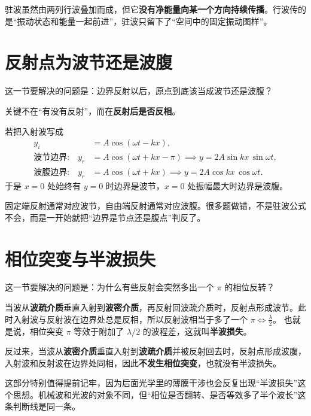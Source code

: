 \documentclass[lang=cn,11pt]{elegantbook}
\begin{document}
\begin{note}
驻波虽然由两列行波叠加而成，但它\textbf{没有净能量向某一个方向持续传播}。行波传的是“振动状态和能量一起前进”，驻波只留下了“空间中的固定振动图样”。
\end{note}

\section{反射点为波节还是波腹}

这一节要解决的问题是：边界反射以后，原点到底该当成波节还是波腹？

关键不在“有没有反射”，而在\textbf{反射后是否反相}。

若把入射波写成
\[
\begin{aligned}
y_i&=A\cos(\omega t-kx),\\
\text{波节边界:}\quad
y_r&=A\cos(\omega t+kx-\pi)
\implies y=2A\sin kx\,\sin\omega t,\\
\text{波腹边界:}\quad
y_r&=A\cos(\omega t+kx)
\implies y=2A\cos kx\,\cos\omega t.
\end{aligned}
\]
于是 \(x=0\) 处始终有 \(y=0\) 时边界是波节，\(x=0\) 处振幅最大时边界是波腹。

\begin{note}
固定端反射通常对应波节，自由端反射通常对应波腹。很多题做错，不是驻波公式不会，而是一开始就把“边界是节点还是腹点”判反了。
\end{note}

\section{相位突变与半波损失}

这一节要解决的问题是：为什么有些反射会突然多出一个 \(\pi\) 的相位反转？

当波从\textbf{波疏介质}垂直入射到\textbf{波密介质}，再反射回波疏介质时，反射点形成波节。此时入射波与反射波在边界处总是反相，所以反射波相当于多了一个
\(\pi \iff \frac{\lambda}{2}\)。
也就是说，相位突变 \(\pi\) 等效于附加了 \(\lambda/2\) 的波程差，这就叫\textbf{半波损失}。

反过来，当波从\textbf{波密介质}垂直入射到\textbf{波疏介质}并被反射回去时，反射点形成波腹，入射波和反射波在边界处同相，因此\textbf{不发生相位突变}，也就没有半波损失。

\begin{remark}
这部分特别值得提前记牢，因为后面光学里的薄膜干涉也会反复出现“半波损失”这个思想。机械波和光波的对象不同，但“相位是否翻转、是否等效多了半个波长”这条判断线是同一条。
\end{remark}
\end{document}
